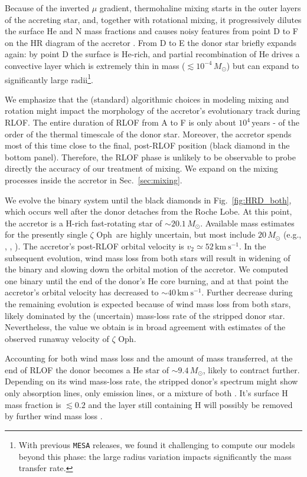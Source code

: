 \documentclass[twocolumn,twocolappendix,trackchanges]{aastex63}
\newcommand{\kms}{{\mathrm{km\ s^{-1}}}}
\DeclareRobustCommand{\Figref}[1]{Fig.~\ref{#1}}
\DeclareRobustCommand{\Secref}[1]{Sec.~\ref{#1}}
\newcommand{\zoph}{$\zeta$ Oph}
\begin{document}
Because of the inverted $\mu$ gradient, thermohaline mixing starts in
the outer layers of the accreting star, and, together with rotational
mixing, it progressively dilutes the surface He and N mass fractions
and causes noisy features from point D to F on the HR diagram of the
accretor \citep[e.g.,][]{cantiello:07}. From D to E the donor star
briefly expands again: by point D the surface is He-rich, and partial
recombination of He drives a convective layer which is extremely thin
in mass ($\lesssim 10^{-4}\,M_\odot$) but can expand to significantly
large radii\footnote{With previous \texttt{MESA} releases, we found it
  challenging to compute our models beyond this phase: the large
  radius variation impacts significantly the mass transfer rate.}.

We emphasize that the (standard) algorithmic choices in
modeling mixing and rotation might impact the morphology of the
accretor's evolutionary track during RLOF. The entire duration of RLOF
from A to F is only about $10^4$\,years - of the order of the thermal timescale of
the donor star. Moreover, the accretor spends most of this time close
to the final, post-RLOF position (black diamond in the bottom
panel). Therefore, the RLOF phase is unlikely to be observable to
probe directly the accuracy of our treatment of mixing. We expand on
the mixing processes inside the accretor in \Secref{sec:mixing}.

We evolve the binary system until the black diamonds in
\Figref{fig:HRD_both}, which occurs well after the donor detaches from
the Roche Lobe. At this point, the accretor is a H-rich fast-rotating
star of
$\sim$$20.1\,M_\odot$. Available mass estimates for the presently single \zoph\ are highly uncertain, but most include
$20\,M_\odot$ (e.g., \citealt{hoogerwerf:01}, , \citealt{neuhauser:20}). The accretor's post-RLOF orbital velocity is
$v_2\simeq52\,\kms$. In the subsequent evolution, wind mass loss from both stars will result in widening of the binary and slowing down the orbital motion of the accretor. We computed one binary until the end of the donor's He core burning, and at that point the accretor's orbital velocity has decreased to
$\sim$$40\,\kms$. Further decrease during the remaining evolution
is expected because of wind mass loss from both stars, likely dominated by the
(uncertain) mass-loss rate of the stripped donor star. Nevertheless,
the value we obtain is in broad agreement with estimates of the
observed runaway velocity of \zoph.

Accounting for both wind mass loss and the amount of mass transferred,
at the end of RLOF the donor becomes a He star of
$\sim$$9.4\,M_\odot$, likely to contract further. Depending on its wind mass-loss rate, the stripped donor's spectrum might show only absorption lines, only emission lines, or a mixture of both \citep[e.g.,][]{crowther:07, neugent:17, gotberg:18}. It's surface H mass fraction is $\lesssim
0.2$ and the layer still containing H will possibly be removed by further wind mass loss \citep[e.g.,][]{gotberg:17}.
\end{document}
